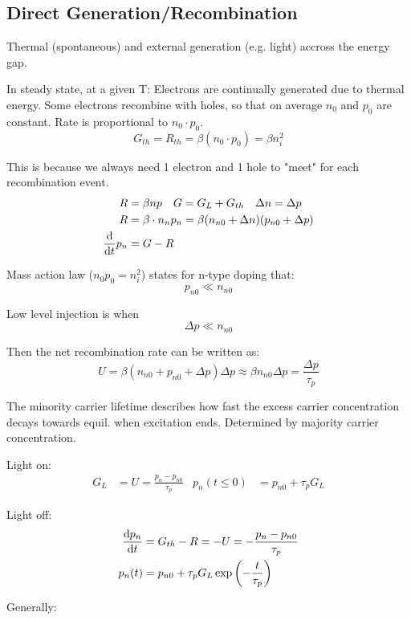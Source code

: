 \documentclass[a4paper, fontsize=8pt, landscape, DIV=1]{scrartcl}
\begin{document}
\begin{multicols*}{4}
  \subsection{Direct Generation/Recombination}
    Thermal (spontaneous) and external generation (e.g. light) accross the energy gap.

    In steady state, at a given T: Electrons are continually generated due to thermal energy.
    Some electrons recombine with holes, so that on average $n_0$ and $p_0$ are constant. 
    Rate is proportional to $n_0 \cdot p_0$. 
    \[G_{th} = R_{th} = \beta(n_0 \cdot p_0) = \beta n_i^2\]

    This is because we always need 1 electron and 1 hole to "meet" for each recombination event.
    \begin{align*}
      R &= \beta n p \quad G = G_L + G_{th} \quad \Delta n = \Delta p\\
      R &= \beta\cdot n_n p_n = \beta(n_{n0}+\Delta n)(p_{n0} + \Delta p)  \\
      \frac{\mathrm{d}}{\mathrm{d}t}p_n &= G-R
    \end{align*}

    Mass action law ($n_0p_0=n_i^2$) states for n-type doping that:
    \[p_{n0} \ll n_{n0}\]

    Low level injection is when
    \[\Delta p \ll n_{n0}\]

    Then the net recombination rate can be written as:
    \[U = \beta(n_{n0}+p_{n0}+\Delta p)\Delta p \approx \beta n_{n0}\Delta p = \frac{\Delta p}{\tau_p}\]

    The minority carrier lifetime describes how fast the excess carrier concentration decays towards equil. when excitation ends. 
    Determined by majority carrier concentration.

    Light on:
    \begin{align*}
      G_L &= U = \frac{p_n-p_{n0}}{\tau_p} & p_n(t \leq 0) &= p_{n0} + \tau_pG_L
    \end{align*}

    Light off:
    \begin{align*}
      \frac{\mathrm{d}p_n}{\mathrm{d}t} &= G_{th} - R = -U = -\frac{p_n-p_{n0}}{\tau_p} \\
      p_n(t) &= p_{n0} + \tau_p G_L \exp\left(-\frac{t}{\tau_p}\right)
    \end{align*}

    Generally:


\end{multicols*}
\end{document}
